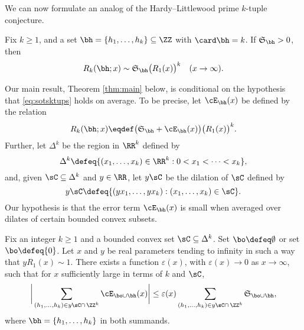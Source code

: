 \documentclass[12pt, reqno, twoside, letterpaper]{amsart}
\begin{document}
We can now formulate an analog of the Hardy--Littlewood prime 
$k$-tuple conjecture.
%
\begin{conjecture}
 \label{con:sotsktups}
%
Fix $k \ge 1$, and a set $\bh = \{h_1,\ldots,h_k\} \subseteq \ZZ$ 
with $\card \bh = k$. 
%
If $\mathfrak{S}_{\bh} > 0$, then
\begin{equation}
 \label{eq:sotsktups}
  R_k(\bh;x)
    \sim 
     \mathfrak{S}_{\bh}
      \big(R_1(x)\big)^k 
       \quad      
     (x \to \infty).
\end{equation}
\end{conjecture}
%
\noindent 
Our main result, Theorem \ref{thm:main} below, is conditional on 
the hypothesis that \eqref{eq:sotsktups} holds on average.
%
To be precise, let $\cE_{\bh}(x)$ be defined by the relation 
\begin{equation}
 \label{eq:defEterm}
   R_k(\bh;x)
    \eqdef
     \big(\mathfrak{S}_{\bh} + \cE_{\bh}(x)\big)
      \big(R_1(x)\big)^k.
\end{equation}
%
Further, let $\Delta^k$ be the region in $\RR^k$ defined by  
\begin{equation}
 \label{eq:defsimplex}
  \Delta^k
   \defeq 
    \{(x_1,\ldots,x_k) \in \RR^k : 0 < x_1 < \cdots < x_k\},
\end{equation}
%
and, given $\sC \subseteq \Delta^k$ and $y \in \RR$, let $y\sC$ 
be the dilation of $\sC$ defined by  
\[
 y\sC \defeq \{(yx_1,\ldots,yx_k) : (x_1,\ldots,x_k) \in \sC\}.
\]
%
%
%
Our hypothesis is that the error term $\cE_{\bh}(x)$ is small when 
averaged over dilates of certain bounded convex subsets.

\begin{hypothesis}[$k,\sC,\bo$]
%
Fix an integer $k \ge 1$ and a bounded convex set 
$\sC \subseteq \Delta^k$.
%
Set $\bo \defeq \emptyset$ or set $\bo \defeq \{0\}$.
%
Let $x$ and $y$ be real parameters tending to infinity in such a 
way that $yR_1(x) \sim 1$.
%
There exists a function $\varepsilon(x)$, with 
$\varepsilon(x) \to 0$ as $x \to \infty$, such that for $x$ 
sufficiently large in terms of $k$ and $\sC$,
\begin{equation}
 \label{eq:hyp}
   \bigg|
    \sum_{(h_1,\ldots,h_k) \in y\sC \cap \, \ZZ^k}
     \cE_{\bo \cup \bh}(x)
   \bigg|
 \le 
  \varepsilon(x)
   \sum_{(h_1,\ldots,h_k) \in y\sC \cap \, \ZZ^k}
    \mathfrak{S}_{\bo \cup \bh},
\end{equation}
where $\bh = \{h_1,\ldots,h_k\}$ in both summands. 
\end{hypothesis}
\end{document}
